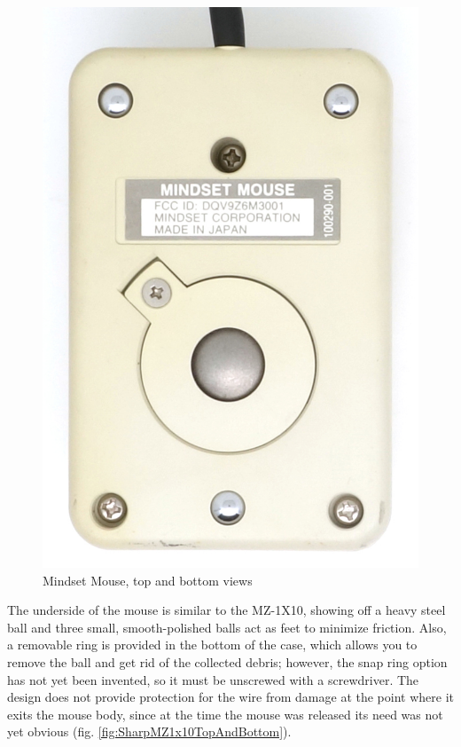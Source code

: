 \documentclass[11pt, a4paper]{article}
\begin{document}
\begin{figure}[h]
    \includegraphics[scale=0.6]{1984_mindset_mouse/bottom_30.jpg}
    \caption{Mindset Mouse, top and bottom views}
    \label{fig:MindsetMouseTopAndBottom}
\end{figure}

The underside of the mouse is similar to the MZ-1X10, showing off a heavy steel ball and three small, smooth-polished balls act as feet to minimize friction. Also, a removable ring is provided in the bottom of the case, which allows you to remove the ball and get rid of the collected debris; however, the snap ring option has not yet been invented, so it must be unscrewed with a screwdriver. The design does not provide protection for the wire from damage at the point where it exits the mouse body, since at the time the mouse was released its need was not yet obvious (fig. \ref{fig:SharpMZ1x10TopAndBottom}).
\end{document}
